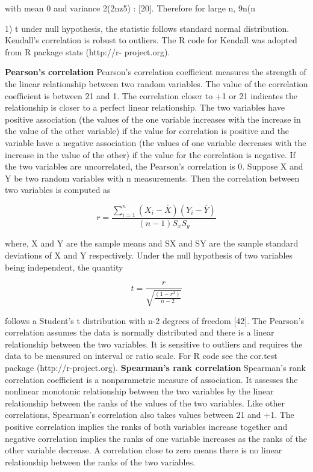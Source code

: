 with mean 0 and variance 2(2nz5) : [20]. Therefore for large n, 9n(n{1) t
under null hypothesis, the statistic follows standard normal distribution. Kendall’s correlation is robust to outliers. The R code for Kendall was adopted from R package stats (http://r- project.org).

\textbf{Pearson’s correlation}
Pearson’s correlation coefficient measures the strength of the linear relationship between two random variables. The value of the correlation coefficient is between 21 and 1. The correlation closer to +1 or 21 indicates the relationship is closer to a perfect linear relationship. The two variables have positive association (the values of the one variable increases with the increase in the value of the other variable) if the value for correlation is positive and the variable have a negative association (the values of one variable decreases with the increase in the value of the other) if the value for the correlation is negative. If the two variables are uncorrelated, the Pearson’s correlation is 0.
Suppose X and Y be two random variables with n measurements. Then the correlation between two variables is computed as

\begin{equation}
r = \frac{\sum_{i =1}^{n}(X_i - \overline{X})(Y_i - \overline{Y}) }{(n-1)S_x S_y}
\end{equation}

where, X  and Y  are the sample means and SX and SY are the sample standard deviations of X and Y respectively. Under the null hypothesis of two variables being independent, the quantity

\begin{equation}
t = \frac{r}{\sqrt{\frac{(1-r^2)}{n-2}}}
\end{equation}

follows a Student’s t distribution with n-2 degrees of freedom [42].
The Pearson’s correlation assumes the data is normally distributed and there is a linear relationship between the two variables. It is sensitive to outliers and requires the data to be measured on interval or ratio scale. For R code see the cor.test package (http://r-project.org). \textbf{Spearman’s rank correlation}
Spearman’s rank correlation coefficient is a nonparametric measure of association. It assesses the nonlinear monotonic relationship between the two variables by the linear relationship between the ranks of the values of the two variables. Like other correlations, Spearman’s correlation also takes values between 21 and +1. The positive correlation implies the ranks of both variables increase together and negative correlation implies the ranks of one variable increases as the ranks of the other variable decrease. A correlation close to zero means there is no linear relationship between the ranks of the two variables.

}
